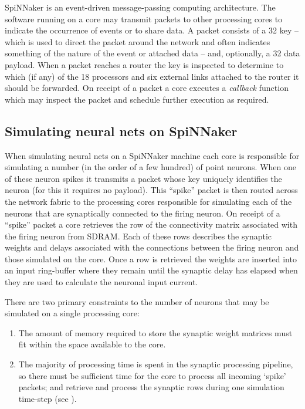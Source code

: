 \documentclass[conference]{IEEEtran}
\begin{document}
SpiNNaker is an event-driven message-passing computing architecture.
The software running on a core may transmit packets to other processing cores to indicate the occurrence of events or to share data.
A packet consists of a \SI{32}{\bit} key -- which is used to direct the packet around the network and often indicates something of the nature of the event or attached data -- and, optionally, a \SI{32}{\bit} data payload.
When a packet reaches a router the key is inspected to determine to which (if any) of the 18 processors and six external links attached to the router it should be forwarded.
On receipt of a packet a core executes a \textit{callback} function which may inspect the packet and schedule further execution as required.

  \subsection{Simulating neural nets on SpiNNaker}
  \label{sef:background/nn}

When simulating neural nets on a SpiNNaker machine each core is responsible for simulating a number (in the order of a few hundred) of point neurons.
When one of these neuron spikes it transmits a packet whose key uniquely identifies the neuron (for this it requires no payload).
This ``spike'' packet is then routed across the network fabric to the processing cores responsible for simulating each of the neurons that are synaptically connected to the firing neuron.
On receipt of a ``spike'' packet a core retrieves the row of the connectivity matrix associated with the firing neuron from SDRAM.
Each of these rows describes the synaptic weights and delays associated with the connections between the firing neuron and those simulated on the core.
Once a row is retrieved the weights are inserted into an input ring-buffer where they remain until the synaptic delay has elapsed when they are used to calculate the neuronal input current.

There are two primary constraints to the number of neurons that may be simulated on a single processing core:

  \begin{enumerate}
    \item The amount of memory required to store the synaptic weight matrices must fit within the space available to the core.
    \item The majority of processing time is spent in the synaptic processing pipeline, so there must be sufficient time for the core to process all incoming `spike' packets; and retrieve and process the synaptic rows during one simulation time-step (see \parencite{Sharp2013}).
  \end{enumerate}
\end{document}
